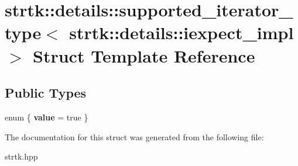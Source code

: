 \hypertarget{structstrtk_1_1details_1_1supported__iterator__type_3_01strtk_1_1details_1_1iexpect__impl_01_4}{\section{strtk\-:\-:details\-:\-:supported\-\_\-iterator\-\_\-type$<$ strtk\-:\-:details\-:\-:iexpect\-\_\-impl $>$ Struct Template Reference}
\label{structstrtk_1_1details_1_1supported__iterator__type_3_01strtk_1_1details_1_1iexpect__impl_01_4}
}
\subsection*{Public Types}
\begin{DoxyCompactItemize}
\item 
enum \{ {\bfseries value} = true
 \}
\end{DoxyCompactItemize}


The documentation for this struct was generated from the following file\-:\begin{DoxyCompactItemize}
\item 
strtk.\-hpp\end{DoxyCompactItemize}
